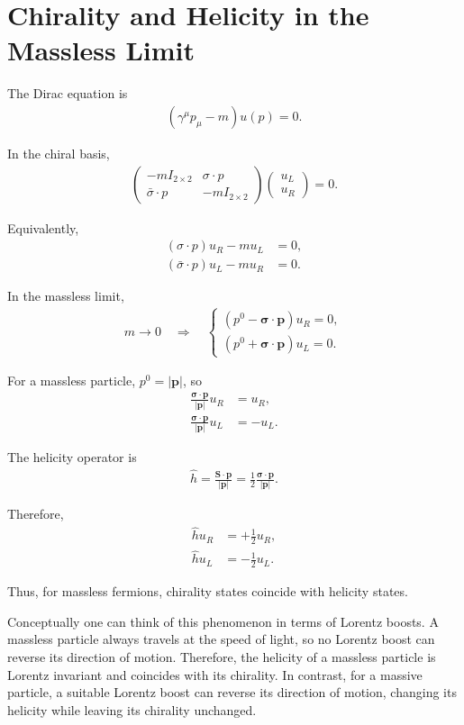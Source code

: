 \section{Chirality and Helicity in the Massless Limit}

The Dirac equation is
\begin{align}
(\gamma^\mu p_\mu - m)u(p) = 0 .
\end{align}

In the chiral basis,
\begin{align}
\begin{pmatrix}
-m I_{2\times 2} & \sigma \cdot p \\
\bar{\sigma} \cdot p & -m I_{2\times 2}
\end{pmatrix}
\begin{pmatrix}
u_L \\
u_R
\end{pmatrix}
= 0 .
\end{align}

Equivalently,
\begin{align}
(\sigma \cdot p)u_R - m u_L &= 0, \\
(\bar{\sigma} \cdot p)u_L - m u_R &= 0 .
\end{align}

In the massless limit,
\begin{align}
m \to 0
\quad\Longrightarrow\quad
\begin{cases}
(p^0 - \boldsymbol{\sigma}\cdot\mathbf{p})u_R = 0, \\
(p^0 + \boldsymbol{\sigma}\cdot\mathbf{p})u_L = 0 .
\end{cases}
\end{align}

For a massless particle, \(p^0 = |\mathbf{p}|\), so
\begin{align}
\frac{\boldsymbol{\sigma}\cdot\mathbf{p}}{|\mathbf{p}|}u_R &= u_R, \\
\frac{\boldsymbol{\sigma}\cdot\mathbf{p}}{|\mathbf{p}|}u_L &= -u_L .
\end{align}

The helicity operator is
\begin{align}
\hat{h}
=
\frac{\mathbf{S}\cdot\mathbf{p}}{|\mathbf{p}|}
=
\frac{1}{2}
\frac{\boldsymbol{\sigma}\cdot\mathbf{p}}{|\mathbf{p}|}.
\end{align}

Therefore,
\begin{align}
\hat{h}u_R &= +\frac{1}{2}u_R, \\
\hat{h}u_L &= -\frac{1}{2}u_L .
\end{align}

Thus, for massless fermions, chirality states coincide with helicity states.

Conceptually one can think of this phenomenon in terms of Lorentz boosts. 
A massless particle always travels at the speed of light, 
so no Lorentz boost can reverse its direction of motion. 
Therefore, the helicity of a massless particle is Lorentz invariant and coincides with its chirality. 
In contrast, for a massive particle, a suitable Lorentz boost can reverse its direction of motion, 
changing its helicity while leaving its chirality unchanged.

